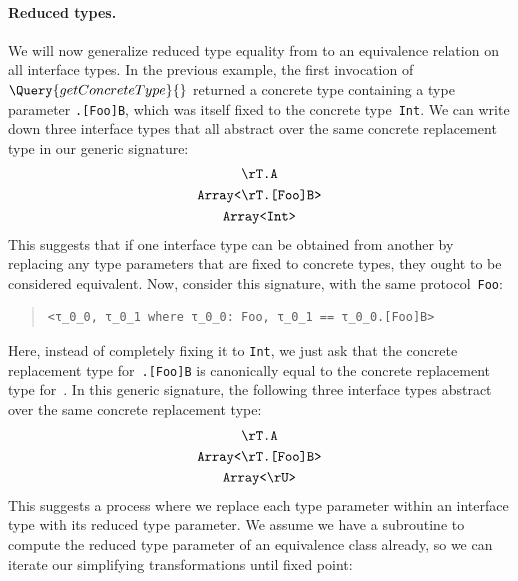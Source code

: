 \documentclass[../generics]{subfiles}
\begin{document}
\paragraph{Reduced types.} We will now generalize reduced type equality from  to an equivalence relation on all interface types. In the previous example, the first invocation of $\Query{getConcreteType}{}$ returned a concrete type containing a type parameter \texttt{\rT.[Foo]B}, which was itself fixed to the concrete type~\texttt{Int}. We can write down three interface types that all abstract over the same concrete replacement type in our generic signature:
\begin{gather*}
\texttt{\rT.A}\\
\texttt{Array<\rT.[Foo]B>}\\
\texttt{Array<Int>}
\end{gather*}
This suggests that if one interface type can be obtained from another by replacing any type parameters that are fixed to concrete types, they ought to be considered equivalent. Now, consider this signature, with the same protocol~\texttt{Foo}:
\begin{quote}
\begin{verbatim}
<τ_0_0, τ_0_1 where τ_0_0: Foo, τ_0_1 == τ_0_0.[Foo]B>
\end{verbatim}
\end{quote}
Here, instead of completely fixing it to \texttt{Int}, we just ask that the concrete replacement type for~\texttt{\rT.[Foo]B} is canonically equal to the concrete replacement type for~\rU. In this generic signature, the following three interface types abstract over the same concrete replacement type:
\begin{gather*}
\texttt{\rT.A}\\
\texttt{Array<\rT.[Foo]B>}\\
\texttt{Array<\rU>}
\end{gather*}
This suggests a process where we replace each type parameter within an interface type with its reduced type parameter. We assume we have a subroutine to compute the reduced type parameter of an equivalence class already, so we can iterate our simplifying transformations until fixed point:
\end{document}
